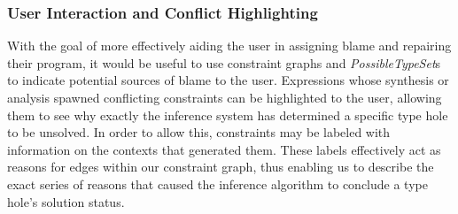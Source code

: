 \subsubsection{User Interaction and Conflict Highlighting}
With the goal of more effectively aiding the user in assigning blame and repairing their program, it would be useful to use constraint graphs and \emph{PossibleTypeSet}s to indicate potential sources of blame to the user. Expressions whose synthesis or analysis spawned conflicting constraints can be highlighted to the user, allowing them to see why exactly the inference system has determined a specific type hole to be unsolved. In order to allow this, constraints may be labeled with information on the contexts that generated them. These labels effectively act as reasons for edges within our constraint graph, thus enabling us to describe the exact series of reasons that caused the inference algorithm to conclude a type hole's solution status.



